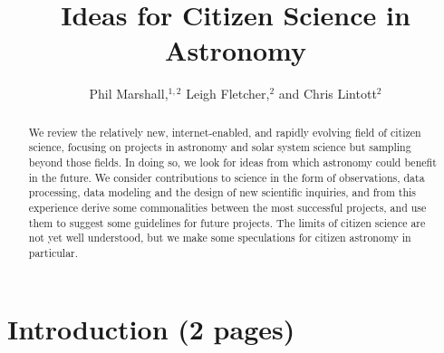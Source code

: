 \documentclass{ar2e}
\begin{document}

\jvol{}
\ARinfo{}

\title{Ideas for Citizen Science in Astronomy}

\author{Phil Marshall,$^{1,2}$
Leigh Fletcher,$^{2}$ and
Chris Lintott$^{2}$
}




\begin{abstract} 

We review the relatively new, internet-enabled, and rapidly evolving field of
citizen science, focusing on projects in astronomy and solar system science but
sampling beyond those fields. In doing so, we look for  ideas from which
astronomy  could benefit in the future. We consider contributions to science in
the form of observations, data processing, data modeling and the design of new
scientific inquiries, and from this experience derive some commonalities between
the most successful projects, and use them to suggest some guidelines for future
projects. The limits of citizen science are not yet well understood, but we make
some speculations for citizen astronomy in particular.


\end{abstract}

\maketitle


\section{Introduction (2 pages)}
\label{sec:intro}
\end{document}
